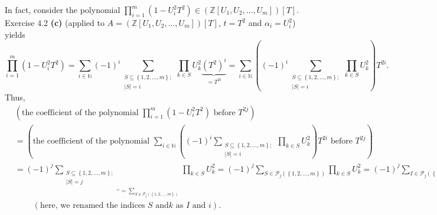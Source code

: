 \documentclass[numbers=enddot,12pt,final,onecolumn,notitlepage]{scrartcl}%
\begin{document}
In fact, consider the polynomial $\prod\limits_{i=1}^{m}\left(  1-U_{i}%
^{2}T^{2}\right)  \in\left(  \mathbb{Z}\left[  U_{1},U_{2},...,U_{m}\right]
\right)  \left[  T\right]  $. Exercise 4.2 \textbf{(c)} (applied to $A=\left(
\mathbb{Z}\left[  U_{1},U_{2},...,U_{m}\right]  \right)  \left[  T\right]  $,
$t=T^{2}$ and $\alpha_{i}=U_{i}^{2}$) yields%
\[
\prod\limits_{i=1}^{m}\left(  1-U_{i}^{2}T^{2}\right)  =\sum_{i\in\mathbb{N}%
}\left(  -1\right)  ^{i}\sum\limits_{\substack{S\subseteq\left\{
1,2,...,m\right\}  ;\\\left\vert S\right\vert =i}}\prod\limits_{k\in S}%
U_{k}^{2}\underbrace{\left(  T^{2}\right)  ^{i}}_{=T^{2i}}=\sum_{i\in
\mathbb{N}}\left(  \left(  -1\right)  ^{i}\sum\limits_{\substack{S\subseteq
\left\{  1,2,...,m\right\}  ;\\\left\vert S\right\vert =i}}\prod\limits_{k\in
S}U_{k}^{2}\right)  T^{2i}.
\]
Thus,%
\begin{align}
&  \left(  \text{the coefficient of the polynomial }\prod\limits_{i=1}%
^{m}\left(  1-U_{i}^{2}T^{2}\right)  \text{ before }T^{2j}\right) \nonumber\\
&  =\left(  \text{the coefficient of the polynomial }\sum_{i\in\mathbb{N}%
}\left(  \left(  -1\right)  ^{i}\sum\limits_{\substack{S\subseteq\left\{
1,2,...,m\right\}  ;\\\left\vert S\right\vert =i}}\prod\limits_{k\in S}%
U_{k}^{2}\right)  T^{2i}\text{ before }T^{2j}\right) \nonumber\\
&  =\left(  -1\right)  ^{j}\underbrace{\sum\limits_{\substack{S\subseteq
\left\{  1,2,...,m\right\}  ;\\\left\vert S\right\vert =j}}}_{=\sum
\limits_{S\in\mathcal{P}_{j}\left(  \left\{  1,2,...,m\right\}  \right)  }%
}\prod\limits_{k\in S}U_{k}^{2}=\left(  -1\right)  ^{j}\sum\limits_{S\in
\mathcal{P}_{j}\left(  \left\{  1,2,...,m\right\}  \right)  }\prod
\limits_{k\in S}U_{k}^{2}=\left(  -1\right)  ^{j}\sum\limits_{I\in
\mathcal{P}_{j}\left(  \left\{  1,2,...,m\right\}  \right)  }\prod
\limits_{i\in I}U_{i}^{2}\label{4.4.sol.4}\\
&  \ \ \ \ \ \ \ \ \ \ \left(  \text{here, we renamed the indices }S\text{ and
}k\text{ as }I\text{ and }i\right)  .\nonumber
\end{align}
\end{document}
